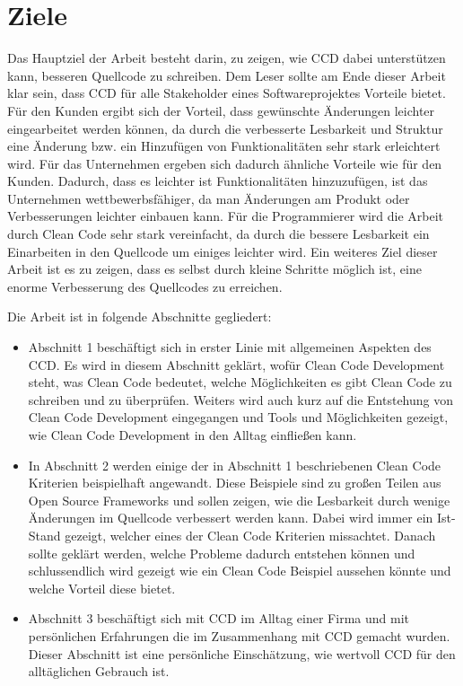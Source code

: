 \section{Ziele}
Das Hauptziel der Arbeit besteht darin, zu zeigen, wie CCD dabei unterstützen kann, besseren Quellcode zu schreiben. Dem Leser sollte am Ende dieser Arbeit klar sein, dass CCD für alle Stakeholder eines Softwareprojektes Vorteile bietet. Für den Kunden ergibt sich der Vorteil, dass gewünschte Änderungen leichter eingearbeitet werden können, da durch die verbesserte Lesbarkeit und Struktur eine Änderung bzw. ein Hinzufügen von Funktionalitäten sehr stark erleichtert wird. Für das Unternehmen ergeben sich dadurch ähnliche Vorteile wie für den Kunden. Dadurch, dass es leichter ist Funktionalitäten hinzuzufügen, ist das Unternehmen wettbewerbsfähiger, da man Änderungen am Produkt oder Verbesserungen leichter einbauen kann. Für die Programmierer wird die Arbeit durch Clean Code sehr stark vereinfacht, da durch die bessere Lesbarkeit ein Einarbeiten in den Quellcode um einiges leichter wird. Ein weiteres Ziel dieser Arbeit ist es zu zeigen, dass es selbst durch kleine Schritte möglich ist, eine enorme Verbesserung des Quellcodes zu erreichen. 

Die Arbeit ist in folgende Abschnitte gegliedert:
\begin{itemize}
	\item Abschnitt 1 beschäftigt sich in erster Linie mit allgemeinen Aspekten des CCD. Es wird in diesem Abschnitt geklärt, wofür Clean Code Development steht, was Clean Code bedeutet, welche Möglichkeiten es gibt Clean Code zu schreiben und zu überprüfen. Weiters wird auch kurz auf die Entstehung von Clean Code Development eingegangen und Tools und Möglichkeiten gezeigt, wie Clean Code Development in den Alltag einfließen kann.
	\item In Abschnitt 2 werden einige der in Abschnitt 1 beschriebenen Clean Code Kriterien beispielhaft angewandt. Diese Beispiele sind zu großen Teilen aus Open Source Frameworks und sollen zeigen, wie die Lesbarkeit durch wenige Änderungen im Quellcode verbessert werden kann. Dabei wird immer ein Ist-Stand gezeigt, welcher eines der Clean Code Kriterien missachtet. Danach sollte geklärt werden, welche Probleme dadurch entstehen können und schlussendlich wird gezeigt wie ein Clean Code Beispiel aussehen könnte und welche Vorteil diese bietet.
	\item Abschnitt 3 beschäftigt sich mit CCD im Alltag einer Firma und mit persönlichen Erfahrungen die im Zusammenhang mit CCD gemacht wurden. Dieser Abschnitt ist eine persönliche Einschätzung, wie wertvoll CCD für den alltäglichen Gebrauch ist.
\end{itemize}

